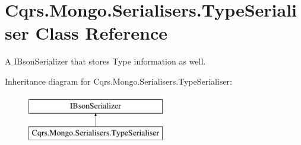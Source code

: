 \hypertarget{classCqrs_1_1Mongo_1_1Serialisers_1_1TypeSerialiser}{}\section{Cqrs.\+Mongo.\+Serialisers.\+Type\+Serialiser Class Reference}
\label{classCqrs_1_1Mongo_1_1Serialisers_1_1TypeSerialiser}


A I\+Bson\+Serializer that stores Type information as well.  


Inheritance diagram for Cqrs.\+Mongo.\+Serialisers.\+Type\+Serialiser\+:\begin{figure}[H]
\begin{center}
\leavevmode
\includegraphics[height=2.000000cm]{classCqrs_1_1Mongo_1_1Serialisers_1_1TypeSerialiser}
\end{center}
\end{figure}
